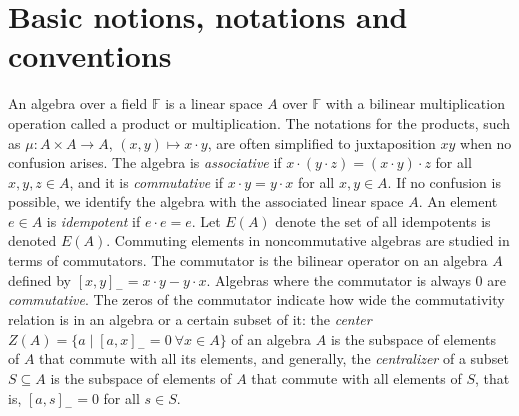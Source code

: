 \documentclass[12pt]{article}
\begin{document}
		\section{Basic notions, notations and conventions} \label{sec-basicnotions}
		An algebra over a field $\mathbb{F}$  is a linear space $A$ over $\mathbb{F}$ with a bilinear multiplication operation called a product or multiplication.
        The notations for the products, such as $\mu\colon A\times A\rightarrow A$, $(x,y)\mapsto x\cdot y$, are often simplified to juxtaposition $xy$ when no confusion arises. The algebra is \textit{associative} if $x\cdot (y\cdot z)=(x\cdot y)\cdot z$ for all $x,y,z\in A$, and it is \textit{commutative} if $x\cdot y=y\cdot x$ for all $x,y\in A$.
		If no confusion is possible, we identify the algebra with the associated linear space $A$. An element $e\in A$ is \textit{idempotent} if $e\cdot e=e$. Let $ E (A) $ denote the set of all idempotents is denoted $E(A)$.
		Commuting elements in noncommutative algebras are studied in terms of commutators.
		The commutator is the bilinear operator on an algebra $A$
		defined by $[x,y]_{-}=x\cdot y-y\cdot x$. Algebras where the commutator is always $0$ are \textit{commutative}.
		The zeros of the commutator indicate how wide the commutativity relation is in an algebra or a certain subset of it: the \textit{center} $Z(A)=\{a \mid [a,x]_{-}=0  \  \forall x\in A\}$ of an algebra $A$ is the subspace of elements of $A$ that commute with all its elements, and generally, the \textit{centralizer} of a subset $S\subseteq A$ is the subspace of elements of $A$ that commute with all elements of $S$, that is, $[a,s]_{-}=0$ for all $s\in S$.
\end{document}
